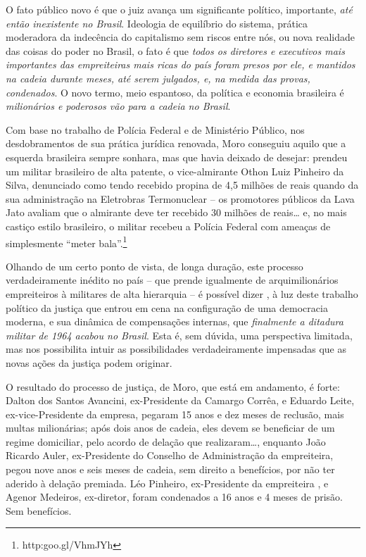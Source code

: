 O fato público novo é que o juiz avança um significante político,
importante, \emph{até então inexistente no Brasil}. Ideologia de
equilíbrio do sistema, prática moderadora da indecência do capitalismo
sem riscos entre nós, ou nova realidade das coisas do poder no Brasil, o
fato é que \emph{todos os diretores e executivos mais importantes das
empreiteiras mais ricas do país foram presos por ele, e mantidos na
cadeia durante meses, até serem julgados, e, na medida das provas,
condenados}. O novo termo, meio espantoso, da política e economia
brasileira é \emph{milionários e poderosos vão para a cadeia no Brasil}.

Com base no trabalho de Polícia Federal e de Ministério Público, nos
desdobramentos de sua prática jurídica renovada, Moro conseguiu aquilo
que a esquerda brasileira sempre sonhara, mas que havia deixado de
desejar: prendeu um militar brasileiro de alta patente, o vice-almirante
Othon Luiz Pinheiro da Silva, denunciado como tendo recebido propina de
4,5 milhões de reais quando da sua administração na Eletrobras
Termonuclear -- os promotores públicos da Lava Jato avaliam que o
almirante deve ter recebido 30 milhões de reais… e, no mais castiço
estilo brasileiro, o militar recebeu a Polícia Federal com ameaças de
simplesmente ``meter bala''.\footnote{http:goo.gl/VhmJYh}

Olhando de um certo ponto de vista, de longa duração, este processo
verdadeiramente inédito no país -- que prende igualmente de
arquimilionários empreiteiros à militares de alta hierarquia -- é
possível dizer , à luz deste trabalho político da justiça que entrou em
cena na configuração de uma democracia moderna, e sua dinâmica de
compensações internas, que \emph{finalmente a ditadura militar de 1964
acabou no Brasil}. Esta é, sem dúvida, uma perspectiva limitada, mas nos
possibilita intuir as possibilidades verdadeiramente impensadas que as
novas ações da justiça podem originar.

O resultado do processo de justiça, de Moro, que está em andamento, é
forte: Dalton dos Santos Avancini, ex-Presidente da Camargo Corrêa, e
Eduardo Leite, ex-vice-Presidente da empresa, pegaram 15 anos e dez
meses de reclusão, mais multas milionárias; após dois anos de cadeia,
eles devem se beneficiar de um regime domiciliar, pelo acordo de delação
que realizaram…, enquanto João Ricardo Auler, ex-Presidente do
Conselho de Administração da empreiteira, pegou nove anos e seis meses
de cadeia, sem direito a benefícios, por não ter aderido à delação
premiada. Léo Pinheiro, ex-Presidente da empreiteira , e Agenor
Medeiros, ex-diretor, foram condenados a 16 anos e 4 meses de prisão.
Sem benefícios.

